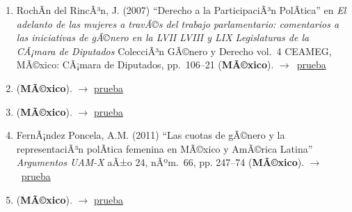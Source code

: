 \documentclass[12 pt, letter]{article}
\newenvironment{CitasMiTrabajo}{
    \begin{footnotesize}
    \begin{enumerate}[label={\footnotesize\emph{cita~\arabic*}},ref=\arabic*] %
        \setlength{\itemsep}{.1\itemsep}
        \setlength{\parskip}{.1\parskip}
    }{\end{enumerate}\end{footnotesize}}
\begin{document}
        \begin{CitasMiTrabajo}

        \item RochÃ­n del RincÃ³n, J. (2007)
        ``Derecho a la ParticipaciÃ³n PolÃ­tica''
        en \emph{El adelanto de las mujeres a travÃ©s del trabajo parlamentario:
        comentarios a las iniciativas de gÃ©nero en la LVII LVIII y LIX
        Legislaturas de la CÃ¡mara de Diputados}
        ColecciÃ³n GÃ©nero y Derecho vol.\ 4 CEAMEG,
        MÃ©xico: CÃ¡mara de Diputados, pp.\ 106--21 (\textbf{MÃ©xico}). $\rightarrow$~\href{http://ericmagar.com/cv/cites/huertaMagar/cdip.pdf}{prueba}

        \item {} (\textbf{MÃ©xico}). $\rightarrow$ \href{http://ericmagar.com/cv/cites/huertaMagar/gonzalezMarin2008.pdf}{prueba}

        \item {} (\textbf{MÃ©xico}). $\rightarrow$ \href{http://ericmagar.com/cv/cites/huertaMagar/arroyo.etal2008.pdf}{prueba}

        \item FernÃ¡ndez Poncela, A.M. (2011) ``Las cuotas de gÃ©nero y la representaciÃ³n polÃ­tica femenina en MÃ©xico y AmÃ©rica Latina''
            \emph{Argumentos UAM-X} aÃ±o 24, nÃºm.\ 66, pp. 247--74 (\textbf{MÃ©xico}). $\rightarrow$~\href{http://ericmagar.com/cv/cites/huertaMagar/fdzPoncela2011.pdf}{prueba}

        \item {} (\textbf{MÃ©xico}). $\rightarrow$ \href{http://ericmagar.com/cv/cites/huertaMagar/martinez.garridoRepresentacionDescSustMx2013rms.pdf}{prueba}

        \label{ncites:magar.huerta.2006} %

        \end{CitasMiTrabajo}





\end{document}
